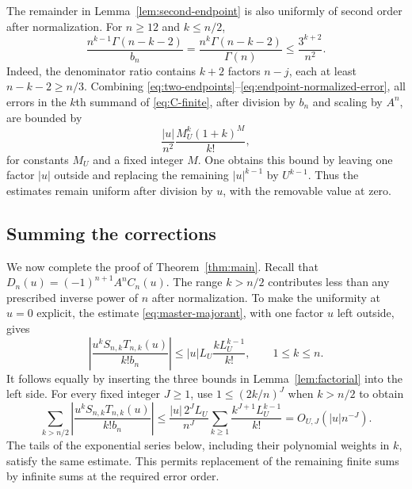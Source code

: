 The remainder in Lemma~\ref{lem:second-endpoint} is also uniformly of
second order after normalization. For $n\ge12$ and $k\le n/2$,
\begin{equation}\label{eq:endpoint-normalized-error}
 \frac{n^{k-1}\Gamma(n-k-2)}{b_n}
 =\frac{n^k\Gamma(n-k-2)}{\Gamma(n)}
 \le\frac{3^{k+2}}{n^2}.
\end{equation}
Indeed, the denominator ratio contains $k+2$ factors $n-j$, each at least
$n-k-2\ge n/3$. Combining
\eqref{eq:two-endpoints}--\eqref{eq:endpoint-normalized-error}, all errors
in the $k$th summand of \eqref{eq:C-finite}, after division by $b_n$ and
scaling by $A^n$, are bounded by
\begin{equation}\label{eq:summable-second-error}
 \frac{|u|}{n^2}\frac{M_U^k(1+k)^M}{k!},
\end{equation}
for constants $M_U$ and a fixed integer $M$. One obtains this bound by
leaving one factor $|u|$ outside and replacing the remaining
$|u|^{k-1}$ by $U^{k-1}$. Thus the estimates remain uniform after division
by $u$, with the removable value at zero.

\subsection{Summing the corrections}

We now complete the proof of Theorem~\ref{thm:main}. Recall that
$D_n(u)=(-1)^{n+1}A^nC_n(u)$. The range $k>n/2$ contributes less than
any prescribed inverse power of $n$ after normalization. To make the
uniformity at $u=0$ explicit, the estimate
\eqref{eq:master-majorant}, with one factor $u$ left outside, gives
\begin{equation}\label{eq:correction-tail-majorant}
 \left|\frac{u^kS_{n,k}T_{n,k}(u)}{k!b_n}\right|
 \le |u|L_U\frac{kL_U^{k-1}}{k!},\qquad 1\le k\le n.
\end{equation}
It follows equally by inserting the three bounds in
Lemma~\ref{lem:factorial} into the left side. For every fixed integer
$J\ge1$, use $1\le(2k/n)^J$ when $k>n/2$ to obtain
\[
 \sum_{k>n/2}
 \left|\frac{u^kS_{n,k}T_{n,k}(u)}{k!b_n}\right|
 \le\frac{|u|\,2^JL_U}{n^J}
       \sum_{k\ge1}\frac{k^{J+1}L_U^{k-1}}{k!}
 =O_{U,J}(|u|n^{-J}).
\]
The tails of the exponential series below, including their polynomial
weights in $k$, satisfy the same estimate. This permits replacement of
the remaining finite sums by infinite sums at the required error order.


